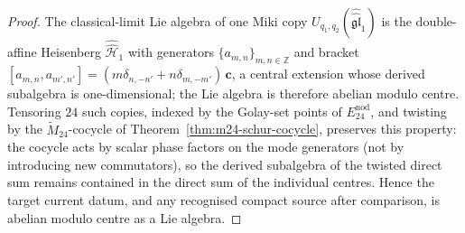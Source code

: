 \begin{proof}
The classical-limit Lie algebra of one Miki copy
$U_{q_1,q_2}(\widehat{\widehat{\mathfrak{gl}}}_1)$ is the double-affine Heisenberg
$\widehat{\widehat{\mathcal{H}}}_1$ with generators $\{a_{m,n}\}_{m,n\in\mathbb{Z}}$
and bracket
$[a_{m,n},a_{m',n'}] = (m\delta_{n,-n'}+n\delta_{m,-m'})\,\mathbf{c}$, a central
extension whose derived subalgebra is one-dimensional; the Lie algebra is
therefore abelian modulo centre. Tensoring $24$ such copies, indexed by the
Golay-set points of $E^{\mathrm{nod}}_{24}$, and twisting by the
$\widetilde{M}_{24}$-cocycle of Theorem~\ref{thm:m24-schur-cocycle}, preserves
this property: the cocycle acts by scalar phase factors on the mode generators
(not by introducing new commutators), so the derived subalgebra of the twisted
direct sum remains contained in the direct sum of the individual centres. Hence
the target current datum, and any recognised compact source after comparison,
is abelian modulo centre as a Lie algebra.


\end{proof}
